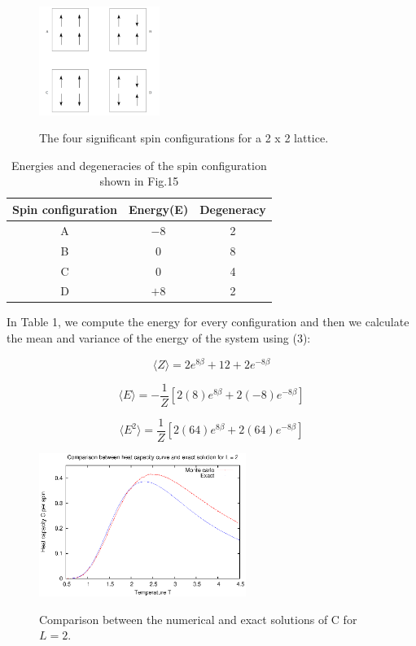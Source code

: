 \documentclass[a4paper]{article}
\begin{document}
\begin{figure}[H]
\centering
\includegraphics[width=0.35\textwidth]{degeneracy.png}
\label{fig:minipage1}
\caption{The four significant spin configurations for a 2 x 2 lattice.}
\end{figure}

\begin{table} [H]
\centering
\begin{tabular}{|c|c|c|}
\hline
Spin configuration   & Energy(E)      & Degeneracy   \\
\hline
A         &  $-8$ 			  &        2          \\
\hline
B         &  $0$              &        8           \\
\hline
C         &  $0$              &        4          \\
\hline
D         &  $+8$             &        2         \\
\hline
\end{tabular}
\caption{Energies and degeneracies of the spin configuration shown in Fig.15 }
\end{table}

In Table 1, we compute the energy for every configuration and then we calculate the mean and variance of the energy of the system using (3):

\begin{equation}
\langle Z \rangle = 2e^{8 \beta} + 12 + 2e^{-8 \beta}
\end{equation}

\begin{equation}
\langle E \rangle = -\frac{1}{Z} [2(8)e^{8 \beta} + 2(-8)e^{-8 \beta}]
\end{equation}

\begin{equation}
\langle E^2 \rangle = \frac{1}{Z} [2(64)e^{8 \beta} + 2(64)e^{-8 \beta}]
\end{equation}

\begin{figure}[H]
\centering
\includegraphics[width=0.6\textwidth]{exact_c.eps}
\label{fig:minipage1}
\caption{Comparison between the numerical and exact solutions of C for $L = 2$.}
\end{figure}
\end{document}
